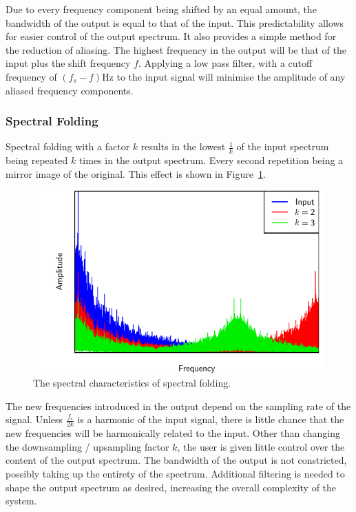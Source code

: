 			Due to every frequency component being shifted by an equal amount, the bandwidth of the output is
			equal to that of the input. This predictability allows for easier control of the output spectrum.
			It also provides a simple method for the reduction of aliasing. The highest frequency in the output
			will be that of the input plus the shift frequency $f$. Applying a low pass filter, with a cutoff
			frequency of $(f_{s} - f)$Hz to the input signal will minimise the amplitude of any aliased
			frequency components.

		\subsubsection*{Spectral Folding}
			Spectral folding with a factor $k$ results in the lowest $\frac{1}{k}$ of the input spectrum being
			repeated $k$ times in the output spectrum. Every second repetition being a mirror image of the
			original. This effect is shown in Figure~\ref{fig:SpectralFolding}. 
			
			\begin{figure}[h!]
				\centering
				\includegraphics{chapter5/Images/SpectralFoldingSpectrum.pdf}
				\caption{The spectral characteristics of spectral folding.}
				\label{fig:SpectralFolding}
			\end{figure}

			The new frequencies introduced in the output depend on the sampling rate of the signal. Unless
			$\frac{f_{s}}{2k}$ is a harmonic of the input signal, there is little chance that the new
			frequencies will be harmonically related to the input. Other than changing the downsampling /
			upsampling factor $k$, the user is given little control over the content of the output spectrum.
			The bandwidth of the output is not constricted, possibly taking up the entirety of the spectrum.
			Additional filtering is needed to shape the output spectrum as desired, increasing the overall
			complexity of the system.


